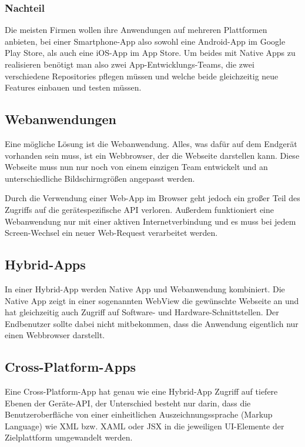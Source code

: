 \subsubsection{Nachteil}
Die meisten Firmen wollen ihre Anwendungen auf mehreren Plattformen anbieten, bei einer
Smartphone-App also sowohl eine Android-App im Google Play Store, als auch eine iOS-App im App Store.
Um beides mit Native Apps zu realisieren benötigt man also zwei App-Entwicklungs-Teams, die zwei
verschiedene Repositories pflegen müssen und welche beide gleichzeitig neue Features einbauen und
testen müssen.

\subsection{Webanwendungen}
Eine mögliche Lösung ist die Webanwendung. Alles, was dafür auf dem Endgerät vorhanden sein muss,
ist ein Webbrowser, der die Webseite darstellen kann. Diese Webseite muss nun nur noch von einem
einzigen Team entwickelt und an unterschiedliche Bildschirmgrößen angepasst werden.

Durch die Verwendung einer Web-App im Browser geht jedoch ein großer Teil des Zugriffs auf die
gerätespezifische API verloren. Außerdem funktioniert eine Webanwendung nur mit einer aktiven
Internetverbindung und es muss bei jedem Screen-Wechsel ein neuer Web-Request verarbeitet werden.

\subsection{Hybrid-Apps}
In einer Hybrid-App werden Native App und Webanwendung kombiniert. Die Native App zeigt in einer
sogenannten WebView die gewünschte Webseite an und hat gleichzeitig auch Zugriff auf Software- und
Hardware-Schnittstellen. Der Endbenutzer sollte dabei nicht mitbekommen, dass die Anwendung
eigentlich nur einen Webbrowser darstellt.

\subsection{Cross-Platform-Apps}
Eine Cross-Platform-App hat genau wie eine Hybrid-App Zugriff auf tiefere Ebenen der Geräte-API,
der Unterschied besteht nur darin, dass die Benutzeroberfläche von einer einheitlichen
Auszeichnungssprache (Markup Language) wie XML bzw. XAML oder JSX in die jeweiligen UI-Elemente der
Zielplattform umgewandelt werden.

\newpage

\newpage

\newpage

\newpage

\newpage